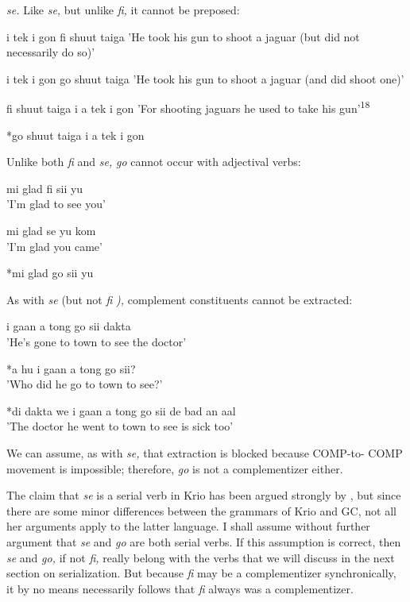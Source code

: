 \textit{se.} Like \textit{se,} but unlike \textit{fi,} it cannot be preposed:

\ea\label{ex:210}
 i tek i gon fi shuut taiga
\glt 'He took his gun to shoot a jaguar (but did not necessarily do so)'
\z



\ea\label{ex:211}
 i tek i gon go shuut taiga
\glt 'He took his gun to shoot a jaguar (and did shoot one)'
\z



\ea\label{ex:212}
 fi shuut taiga i a tek i gon
\glt 'For shooting jaguars he used to take his gun'\textsuperscript{18}
\z



\ea\label{ex:213}
 *go shuut taiga i a tek i gon
\z

Unlike both \textit{fi} and \textit{se,} \textit{go} cannot occur with adjectival verbs:

\ea\label{ex:214}
 mi glad fi sii yu\\
\glt'I'm glad to see you'
\z



\ea\label{ex:215}
 mi glad se yu kom \\
\glt 'I'm glad you came'
\z

\ea\label{ex:216}
 *mi glad go sii yu
\z

As with \textit{se} (but not \textit{fi} \textit{),} complement constituents cannot be extracted:


\ea\label{ex:217}
 i gaan a tong go sii dakta\\
\glt 'He's gone to town to see the doctor'
\z

\ea\label{ex:218}
 *a hu i gaan a tong go sii?\\
\glt  'Who did he go to town to see?'
\z



\ea\label{ex:219}
 *di dakta we i gaan a tong go sii de bad an aal \\
\glt 'The doctor he went to town to see is sick too'
\z

We can assume, as with \textit{se,} that extraction is blocked because COMP-to-%
COMP movement is impossible; therefore, \textit{go} is not a complementizer either.

The claim that \textit{se }is a serial verb in Krio has been argued strongly
by \citet{Larimore1976}, but since there are some minor differences between the grammars of Krio and GC, not all her arguments apply to the latter language. I shall assume without further argument that \textit{se} and \textit{go} are both serial verbs. If this assumption is correct, then \textit{se} and \textit{go,} if not \textit{fi,} really belong with the verbs that we will discuss in the next section on serialization. But because \textit{fi} may be a comple\-mentizer synchronically, it by no means necessarily follows that \textit{fi} always was a complementizer.

